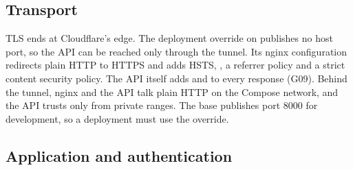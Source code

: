\documentclass[11pt,a4paper]{article}
\begin{document}
\subsection{Transport}

TLS ends at Cloudflare's edge. The deployment override on  publishes no host port, so
the API can be reached only through the tunnel. Its nginx configuration redirects plain HTTP to HTTPS and adds HSTS,
, a referrer policy and a strict content security policy. The API itself adds
 and  to every response (G09). Behind the tunnel, nginx and the API talk plain HTTP on the
Compose network, and the API trusts  only from private ranges. The base 
publishes port 8000 for development, so a deployment must use the override.

\subsection{Application and authentication}
\end{document}
